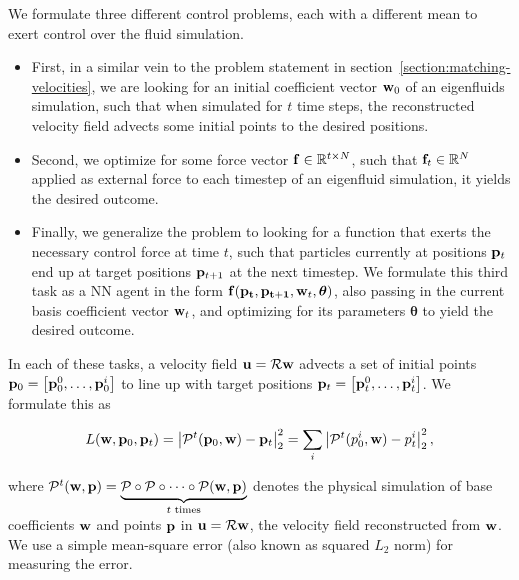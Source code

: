 We formulate three different control problems, each with a different mean to
exert control over the fluid simulation.
\begin{itemize}
  \item First, in a similar vein to the problem statement in
    section~\ref{section:matching-velocities}, we are looking for an initial
    coefficient vector $\vb{w}_0$ of an eigenfluids simulation, such that when
    simulated for $t$ time steps, the reconstructed velocity field advects some
    initial points to the desired positions.
  \item Second, we optimize for some force vector $\vb{f}\in \mathbb{R}^{t\times
    N}$, such that $\vb{f}_t \in \mathbb{R}^N$ applied as external force to each
    timestep of an eigenfluid simulation, it yields the desired outcome.
  \item Finally, we generalize the problem to looking for a function that exerts
    the necessary control force at time $t$, such that particles currently at
    positions $\vb{p}_t$ end up at target positions $\vb{p}_{t+1}$ at the
    next timestep. We formulate this third task as a \acf{NN} agent in the
    form $\vb{f}(\vb{p_t}, \vb{p_{t+1}}, \vb{w}_{t}, \boldsymbol\theta)$, also
    passing in the current basis coefficient vector $\vb{w}_t$, and optimizing
    for its parameters $\boldsymbol\theta$ to yield the desired outcome.
\end{itemize}

In each of these tasks, a velocity field $\vb{u} = \mathcal{R}\vb{w}$ advects
a set of initial points $\vb{p}_0 = \left[\vb{p}_0^0,\dots, \vb{p}_0^i\right]$
to line up with target positions $\vb{p}_t = \left[\vb{p}_t^0, \dots,
\vb{p}_t^i\right]$.  We formulate this as 

\begin{equation}\label{eq:advecting-particles-loss}
  L(\vb{w}, \vb{p}_0, \vb{p}_t)
  = \left| \mathcal{P}^{t}(\vb{p}_0, \vb{w}) - \vb{p}_t\right|_2^2 
  = \sum_{i}\left|\mathcal{P}^{t}(p_0^i, \vb{w}) - p_t^i\right|_2^2, 
\end{equation}

where $\mathcal{P}^t(\vb{w}, \vb{p}) = \underbrace{\mathcal{P} \circ
\mathcal{P}\circ \dots \circ \mathcal{P}(\vb{w}, \vb{p})}_{t \text{ times}}$
denotes the physical simulation of base coefficients $\vb{w}$ and points
$\vb{p}$ in $\vb{u} = \mathcal{R}\vb{w}$, the velocity field reconstructed from
$\vb{w}$.  We use a simple mean-square error (also known as squared $L_2$ norm)
for measuring the error.

